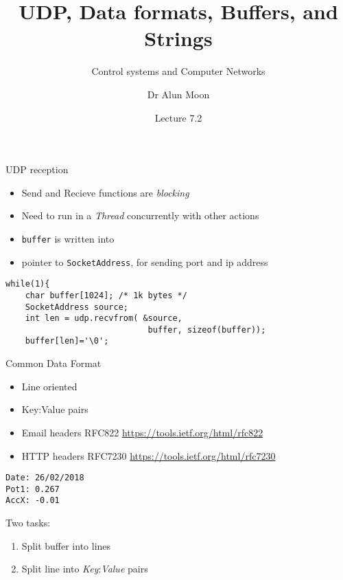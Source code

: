 \documentclass[xcolor=svgnames]{beamer}
\title{UDP, Data formats, Buffers, and Strings}
\subtitle{Control systems and Computer Networks}
\author{Dr Alun Moon}
\date{Lecture 7.2}
\begin{document}
\frame{\maketitle}

\begin{frame}[fragile]{UDP reception}
\begin{itemize}
    \item Send and Recieve functions are \emph{blocking}
    \item Need to run in a \emph{Thread} concurrently with other actions
    \item \texttt{buffer} is written into
    \item pointer to \texttt{SocketAddress}, for sending port and ip address
\end{itemize}
\begin{exampleblock}{}
\begin{verbatim}
while(1){
    char buffer[1024]; /* 1k bytes */
    SocketAddress source;
    int len = udp.recvfrom( &source,
                             buffer, sizeof(buffer));
    buffer[len]='\0';
\end{verbatim}
\end{exampleblock}
\end{frame}

\begin{frame}[fragile]{Common Data Format}
\begin{itemize}
    \item Line oriented
    \item Key:Value pairs
\end{itemize}
\begin{block}{}
\begin{itemize}
    \item Email headers RFC822 \url{https://tools.ietf.org/html/rfc822}
    \item HTTP headers RFC7230 \url{https://tools.ietf.org/html/rfc7230}
\end{itemize}
\end{block}

\begin{exampleblock}{}
\begin{verbatim}
Date: 26/02/2018
Pot1: 0.267
AccX: -0.01
\end{verbatim}
\end{exampleblock}

Two tasks:
\begin{enumerate}
    \item Split buffer into lines
    \item Split line into \emph{Key}:\emph{Value} pairs
\end{enumerate}

\end{frame}
\end{document}
